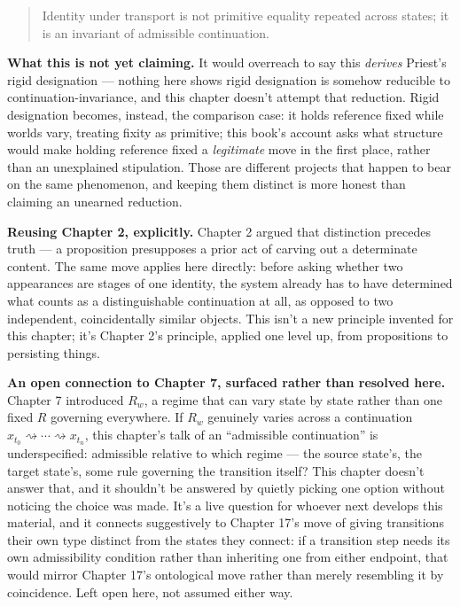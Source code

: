 \begin{quote}
Identity under transport is not primitive equality repeated across
states; it is an invariant of admissible continuation.
\end{quote}

\textbf{What this is not yet claiming.} It would overreach to say this
\emph{derives} Priest's rigid designation --- nothing here shows rigid
designation is somehow reducible to continuation-invariance, and this
chapter doesn't attempt that reduction. Rigid designation becomes,
instead, the comparison case: it holds reference fixed while worlds vary,
treating fixity as primitive; this book's account asks what structure
would make holding reference fixed a \emph{legitimate} move in the first
place, rather than an unexplained stipulation. Those are different
projects that happen to bear on the same phenomenon, and keeping them
distinct is more honest than claiming an unearned reduction.

\textbf{Reusing Chapter 2, explicitly.} Chapter 2 argued that distinction
precedes truth --- a proposition presupposes a prior act of carving out a
determinate content. The same move applies here directly: before asking
whether two appearances are stages of one identity, the system already
has to have determined what counts as a distinguishable continuation at
all, as opposed to two independent, coincidentally similar objects. This
isn't a new principle invented for this chapter; it's Chapter 2's
principle, applied one level up, from propositions to persisting things.

\textbf{An open connection to Chapter 7, surfaced rather than resolved here.}
Chapter 7 introduced \(R_w\), a regime that can vary state by state rather
than one fixed \(R\) governing everywhere. If \(R_w\) genuinely varies across
a continuation \(x_{t_0} \rightsquigarrow \cdots \rightsquigarrow x_{t_n}\),
this chapter's talk of an ``admissible continuation'' is underspecified:
admissible relative to which regime --- the source state's, the target
state's, some rule governing the transition itself? This chapter doesn't
answer that, and it shouldn't be answered by quietly picking one option
without noticing the choice was made. It's a live question for whoever
next develops this material, and it connects suggestively to Chapter
17's move of giving transitions their own type distinct from the states
they connect: if a transition step needs its own admissibility condition
rather than inheriting one from either endpoint, that would mirror
Chapter 17's ontological move rather than merely resembling it by
coincidence. Left open here, not assumed either way.

